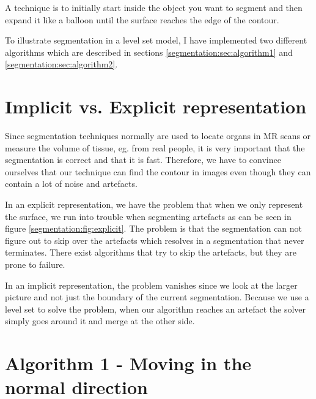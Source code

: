 A technique is to initially start inside the object you want to
segment and then expand it like a balloon until the surface reaches
the edge of the contour.

To illustrate segmentation in a level set model, I have implemented
two different algorithms which are described in sections
\vref{segmentation:sec:algorithm1} and
\vref{segmentation:sec:algorithm2}.


\section{Implicit vs. Explicit representation}


Since segmentation techniques normally are used to locate organs in MR
scans or measure the volume of tissue, eg. from real people, it is
very important that the segmentation is correct and that it is
fast. Therefore, we have to convince ourselves that our technique can
find the contour in images even though they can contain a lot of noise
and artefacts.

In an explicit representation, we have the problem that when we only
represent the surface, we run into trouble when segmenting artefacts
as can be seen in figure \vref{segmentation:fig:explicit}. The problem
is that the segmentation can not figure out to skip over the artefacts
which resolves in a segmentation that never terminates. There exist
algorithms that try to skip the artefacts, but they are prone to
failure.


In an implicit representation, the problem vanishes since we look at
the larger picture and not just the boundary of the current
segmentation. Because we use a level set to solve the problem, when
our algorithm reaches an artefact the solver simply goes around it and
merge at the other side.


\section{Algorithm 1 - Moving in the normal direction}
\label{segmentation:sec:algorithm1}

